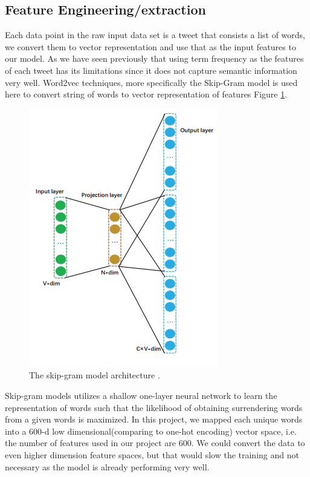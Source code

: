 \documentclass[journal, a4paper]{IEEEtran}
\begin{document}
\subsection{Feature Engineering/extraction}
Each data point in the raw input data set is a tweet that consists a list of words, we convert them to vector representation and use that as the input features to our model. As we have seen previously that using term frequency as the features of each tweet has its limitations since it does not capture semantic information very well. Word2vec techniques, more specifically the Skip-Gram model is used here to convert string of words to vector representation of features Figure \ref{fig:3}.
\begin{figure}[!hbt]
	\centering
	\includegraphics[width=0.8\columnwidth]{word2vec.png}
	\caption{ The skip-gram model architecture \cite{Li-lstm}.}
	\label{fig:3}
\end{figure}

Skip-gram models utilizes a shallow one-layer neural network to learn the representation of words such that the likelihood of obtaining surrendering words from a given words is maximized. In this project, we mapped each unique words into a 600-d low dimensional(comparing to one-hot encoding) vector space, i.e. the number of features used in our project are 600. We could convert the data to even higher dimension feature spaces, but that would slow the training and not necessary as the model is already performing very well.
\end{document}
